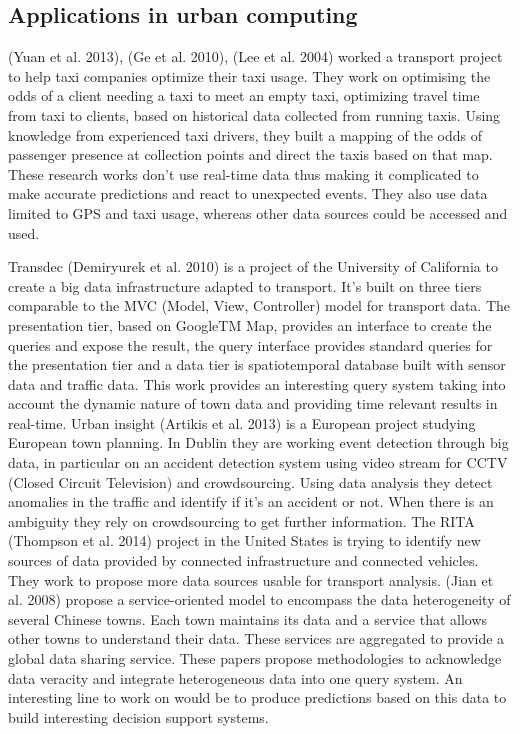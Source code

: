 \subsection{Applications in urban computing}

(Yuan et al. 2013), (Ge et al. 2010), (Lee et al. 2004) worked a transport project to help taxi companies optimize their taxi usage. They work on optimising the odds of a client needing a taxi to meet an empty taxi, optimizing travel time from taxi to clients, based on historical data collected from running taxis. Using knowledge from experienced taxi drivers, they built a mapping of the odds of passenger presence at collection points and direct the taxis based on that map. These research works don’t use real-time data thus making it complicated to make accurate predictions and react to unexpected events. They also use data limited to GPS and taxi usage, whereas other data sources could be accessed and used.

Transdec (Demiryurek et al. 2010) is a project of the University of California to create a big data infrastructure adapted to transport. It’s built on three tiers comparable to the MVC (Model, View, Controller) model for transport data. The presentation tier, based on GoogleTM Map, provides an interface to create the queries and expose the result, the query interface provides standard queries for the presentation tier and a data tier is spatiotemporal database built with sensor data and traffic data. This work provides an interesting query system taking into account the dynamic nature of town data and providing time relevant results in real-time. Urban insight (Artikis et al. 2013) is a European project studying European town planning. In Dublin they are working event detection through big data, in particular on an accident detection system using video stream for CCTV (Closed Circuit Television) and crowdsourcing. Using data analysis they detect anomalies in the traffic and identify if it’s an accident or not. When there is an ambiguity they rely on crowdsourcing to get further information. The RITA (Thompson et al. 2014) project in the United States is trying to identify new sources of data provided by connected infrastructure and connected vehicles. They work to propose more data sources usable for transport analysis. (Jian et al. 2008) propose a service-oriented model to encompass the data heterogeneity of several Chinese towns. Each town maintains its data and a service that allows other towns to understand their data. These services are aggregated to provide a global data sharing service. These papers propose methodologies to acknowledge data veracity and integrate heterogeneous data into one query system. An interesting line to work on would be to produce predictions based on this data to build interesting decision support systems. 

